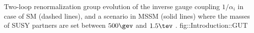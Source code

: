 {Two-loop renormalization group evolution of the inverse gauge coupling $1/\alpha_i$ in case of SM (dashed lines), and a scenario in MSSM (solid lines) where the masses of SUSY partners are set between $500\gev$ and $1.5\tev$ \cite{SUSYPrimer}.}
{fig::Introduction::GUT}



% 
% 



